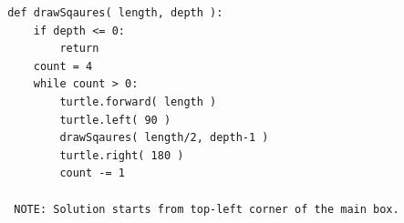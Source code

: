     \begin{answer}

\vspace{-28pt}

    \begin{lstlisting}
       def drawSqaures( length, depth ):
           if depth <= 0:
               return
           count = 4
           while count > 0:
               turtle.forward( length )
               turtle.left( 90 )
               drawSqaures( length/2, depth-1 )
               turtle.right( 180 )
               count -= 1
        
        NOTE: Solution starts from top-left corner of the main box.
      \end{lstlisting}
     \end{answer}